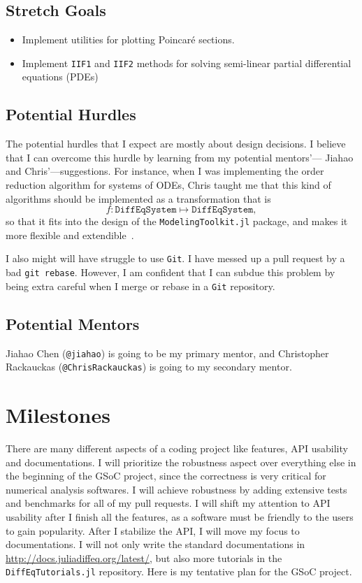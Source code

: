 \documentclass[12pt]{article}
\begin{document}
\subsection{Stretch Goals}
\begin{itemize}
  \item Implement utilities for plotting Poincar\'e sections.
  \item Implement \texttt{IIF1} and \texttt{IIF2} methods for solving
    semi-linear partial differential equations (PDEs)
\end{itemize}

\subsection{Potential Hurdles}
The potential hurdles that I expect are mostly about design decisions. I
believe that I can overcome this hurdle by learning from my potential
mentors'--- Jiahao and Chris'---suggestions. For instance, when I was
implementing the order reduction algorithm for systems of ODEs, Chris taught me
that this kind of algorithms should be implemented as a transformation that is
\[
  f: \texttt{DiffEqSystem}\mapsto \texttt{DiffEqSystem},
\]
so that it fits into the design of the \texttt{ModelingToolkit.jl} package, and
makes it more flexible and extendible~\cite{i49}.

I also might will have struggle to use \texttt{Git}. I have messed up a pull
request by a bad \texttt{git rebase}. However, I am confident that I can subdue
this problem by being extra careful when I merge or rebase in a \texttt{Git}
repository.

\subsection{Potential Mentors}
Jiahao Chen (\texttt{@jiahao}) is going to be my primary mentor, and
Christopher Rackauckas (\texttt{@ChrisRackauckas}) is going to my secondary
mentor.

\section{Milestones}
There are many different aspects of a coding project like features, API
usability and documentations. I will prioritize the robustness aspect over
everything else in the beginning of the GSoC project, since the correctness is
very critical for numerical analysis softwares. I will achieve robustness by
adding extensive tests and benchmarks for all of my pull requests. I will shift
my attention to API usability after I finish all the features, as a software
must be friendly to the users to gain popularity. After I stabilize the API, I
will move my focus to documentations. I will not only write the standard
documentations in \url{http://docs.juliadiffeq.org/latest/}, but also more
tutorials in the \texttt{DiffEqTutorials.jl} repository. Here is my tentative
plan for the GSoC project.
\end{document}
